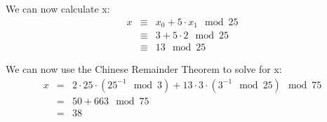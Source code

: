 We can now calculate x:
\begin{eqnarray*}
    x &\equiv& x_{0} + 5 \cdot x_{1} \mod 25\\
    &\equiv& 3 + 5 \cdot 2 \mod 25 \\
    &\equiv& 13 \mod 25
\end{eqnarray*}

We can now use the Chinese Remainder Theorem to solve for x:
\begin{eqnarray*}
    x &=& 2 \cdot 25 \cdot (25^{-1} \mod 3) + 13 \cdot 3 \cdot (3^{-1} \mod 25) \mod 75 \\
    &=& 50 + 663 \mod 75 \\
    &=& 38
\end{eqnarray*}